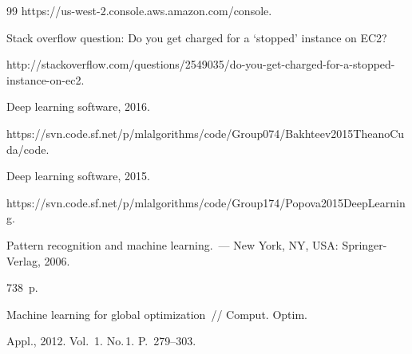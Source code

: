 {{\begin{thebibliography}{99}
{\sf https://us-west-2.console.aws.amazon.com/console}.









Stack overflow question: Do you get charged for a `stopped' instance on EC2? 


{\sf http://stackoverflow.com/questions/2549035/do-you-get-charged-for-a-stopped-instance-on-ec2}.













 Deep learning software, 2016.


{\sf https://svn.code.sf.net/p/\linebreak mlalgorithms/code/Group074/Bakhteev2015TheanoCuda/code}.







 Deep learning software, 2015.


{\sf https://svn.code.sf.net/p/\linebreak mlalgorithms/code/Group174/Popova2015DeepLearning}.









Pattern recognition and machine learning.~--- New York, NY, USA: Springer-Verlag, 2006. 


738~p.













Machine learning for global optimization~/\!\!/ Comput. Optim. 


Appl., 2012. Vol.~1. No.\,1. P.~279--303.


     \end{thebibliography}


} }








